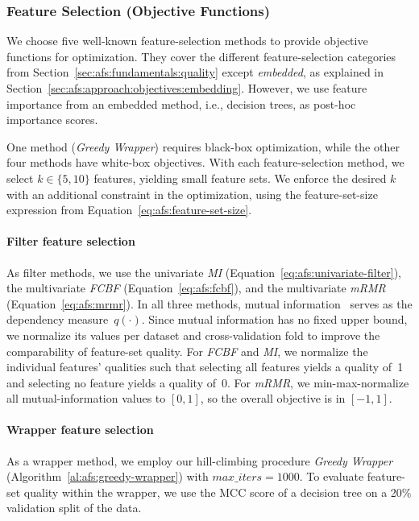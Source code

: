 \documentclass[iicol, sn-basic, Numbered]{sn-jnl} %
\theoremstyle{plain}
\theoremstyle{definition}
\begin{document}
\subsubsection{Feature Selection (Objective Functions)}
\label{sec:afs:experimental-design:approaches:feature-selection}

We choose five well-known feature-selection methods to provide objective functions for optimization.
They cover the different feature-selection categories from Section~\ref{sec:afs:fundamentals:quality} except \emph{embedded}, as explained in Section~\ref{sec:afs:approach:objectives:embedding}.
However, we use feature importance from an embedded method, i.e., decision trees, as post-hoc importance scores.

One method (\emph{Greedy Wrapper}) requires black-box optimization, while the other four methods have white-box objectives. 
With each feature-selection method, we select $k \in \{5,10\}$ features, yielding small feature sets.
We enforce the desired $k$ with an additional constraint in the optimization, using the feature-set-size expression from Equation~\ref{eq:afs:feature-set-size}.

\paragraph{Filter feature selection}

As filter methods, we use the univariate \emph{MI} (Equation~\ref{eq:afs:univariate-filter}), the multivariate \emph{FCBF} (Equation~\ref{eq:afs:fcbf}), and the multivariate \emph{mRMR} (Equation~\ref{eq:afs:mrmr}).
In all three methods, mutual information~\cite{kraskov2004estimating} serves as the dependency measure~$q(\cdot)$.
Since mutual information has no fixed upper bound, we normalize its values per dataset and cross-validation fold to improve the comparability of feature-set quality.
For \emph{FCBF} and \emph{MI}, we normalize the individual features' qualities such that selecting all features yields a quality of~1 and selecting no feature yields a quality of~0.
For \emph{mRMR}, we min-max-normalize all mutual-information values to $[0,1]$, so the overall objective is in $[-1,1]$.

\paragraph{Wrapper feature selection}

As a wrapper method, we employ our hill-climbing procedure \emph{Greedy Wrapper} (Algorithm~\ref{al:afs:greedy-wrapper}) with $max\_iters = 1000$.
To evaluate feature-set quality within the wrapper, we use the MCC score of a decision tree on a 20\% validation split of the data.
\end{document}
